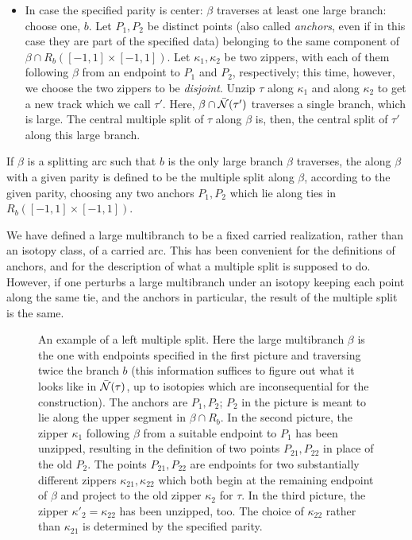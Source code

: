 \begin{defin}
\begin{itemize}
\item In case the specified parity is center: $\beta$ traverses at least one large branch: choose one, $b$. Let $P_1,P_2$ be distinct points (also called \emph{anchors}, even if in this case they are part of the specified data) belonging to the same component of $\beta\cap R_b([-1,1]\times[-1,1])$. Let $\kappa_1,\kappa_2$ be two zippers, with each of them following $\beta$ from an endpoint to $P_1$ and $P_2$, respectively; this time, however, we choose the two zippers to be \emph{disjoint}. Unzip $\tau$ along $\kappa_1$ and along $\kappa_2$ to get a new track which we call $\tau'$. Here, $\beta\cap\bar{{\mathcal N}}(\tau')$ traverses a single branch, which is large. The central multiple split of $\tau$ along $\beta$ is, then, the central split of $\tau'$ along this large branch.
\end{itemize}

If $\beta$ is a splitting arc such that $b$ is the only large branch $\beta$ traverses, the  along $\beta$ with a given parity is defined to be the multiple split along $\beta$, according to the given parity, choosing any two anchors $P_1,P_2$ which lie along ties in $R_b([-1,1]\times[-1,1])$.
\end{defin}

\begin{rmk}
We have defined a large multibranch to be a fixed carried realization, rather than an isotopy class, of a carried arc. This has been convenient for the definitions of anchors, and for the description of what a multiple split is supposed to do. However, if one perturbs a large multibranch under an isotopy keeping each point along the same tie, and the anchors in particular, the result of the multiple split is the same.
\end{rmk}

\begin{figure}[htbp]
\begin{center}
\def\svgwidth{\textwidth}

\end{center}
\caption{\label{fig:multiplesplit}An example of a left multiple split. Here the large multibranch $\beta$ is the one with endpoints specified in the first picture and traversing twice the branch $b$ (this information suffices to figure out what it looks like in $\bar{{\mathcal N}}(\tau)$, up to isotopies which are inconsequential for the construction). The anchors are $P_1,P_2$; $P_2$ in the picture is meant to lie along the upper segment in $\beta\cap R_b$. In the second picture, the zipper $\kappa_1$ following $\beta$ from a suitable endpoint to $P_1$ has been unzipped, resulting in the definition of two points $P_{21},P_{22}$ in place of the old $P_2$. The points $P_{21}, P_{22}$ are endpoints for two substantially different zippers $\kappa_{21},\kappa_{22}$ which both begin at the remaining endpoint of $\beta$ and project to the old zipper $\kappa_2$ for $\tau$. In the third picture, the zipper $\kappa'_2=\kappa_{22}$ has been unzipped, too. The choice of $\kappa_{22}$ rather than $\kappa_{21}$ is determined by the specified parity.}
\end{figure}

